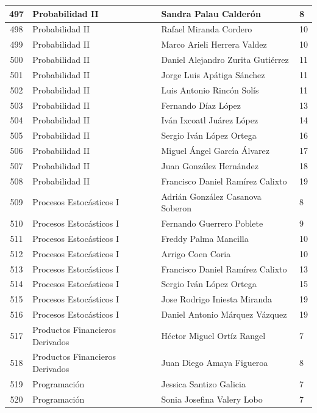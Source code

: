 {\begin{longtable}{|c|p{6.5cm}|p{5cm}|p{1.5cm}|}
  497 & Probabilidad II & Sandra Palau Calderón & 8 \\ \hline 
  498 & Probabilidad II & Rafael Miranda Cordero & 10 \\ \hline 
  499 & Probabilidad II & Marco Arieli Herrera Valdez & 10 \\ \hline 
  500 & Probabilidad II & Daniel Alejandro Zurita Gutiérrez & 11 \\ \hline 
  501 & Probabilidad II & Jorge Luis Apátiga Sánchez & 11 \\ \hline 
  502 & Probabilidad II & Luis Antonio Rincón Solís & 11 \\ \hline 
  503 & Probabilidad II & Fernando Díaz López & 13 \\ \hline 
  504 & Probabilidad II & Iván Ixcoatl Juárez López & 14 \\ \hline 
  505 & Probabilidad II & Sergio Iván López Ortega & 16 \\ \hline 
  506 & Probabilidad II & Miguel Ángel García Álvarez & 17 \\ \hline 
  507 & Probabilidad II & Juan González Hernández & 18 \\ \hline 
  508 & Probabilidad II & Francisco Daniel Ramírez Calixto & 19 \\ \hline 
  509 & Procesos Estocásticos I & Adrián González Casanova Soberon & 8 \\ \hline 
  510 & Procesos Estocásticos I & Fernando Guerrero Poblete & 9 \\ \hline 
  511 & Procesos Estocásticos I & Freddy Palma Mancilla & 10 \\ \hline 
  512 & Procesos Estocásticos I & Arrigo Coen Coria & 10 \\ \hline 
  513 & Procesos Estocásticos I & Francisco Daniel Ramírez Calixto & 13 \\ \hline 
  514 & Procesos Estocásticos I & Sergio Iván López Ortega & 15 \\ \hline 
  515 & Procesos Estocásticos I & Jose Rodrigo Iniesta Miranda & 19 \\ \hline 
  516 & Procesos Estocásticos I & Daniel Antonio Márquez Vázquez & 19 \\ \hline 
  517 & Productos Financieros Derivados & Héctor Miguel Ortíz Rangel & 7 \\ \hline 
  518 & Productos Financieros Derivados & Juan Diego Amaya Figueroa & 8 \\ \hline 
  519 & Programación & Jessica Santizo Galicia & 7 \\ \hline 
  520 & Programación & Sonia Josefina Valery Lobo & 7 \\ \hline 

\end{longtable}}
